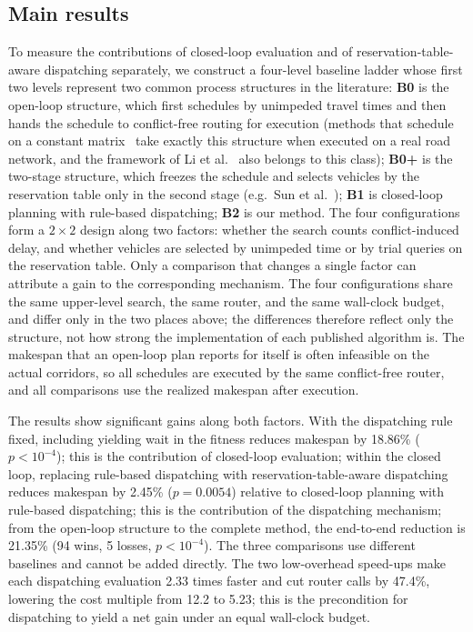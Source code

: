 \documentclass[manuscript,screen,review]{acmart}
\newcommand{\GainLoopRule}{18.86\%}      %
\newcommand{\PLoopRule}{<10^{-4}}
\newcommand{\GainProbeLoop}{2.45\%}      %
\newcommand{\PProbeLoop}{=0.0054}
\newcommand{\GainEndToEnd}{21.35\%}      %
\newcommand{\PEndToEnd}{<10^{-4}}
\newcommand{\WinEndToEnd}{94}
\newcommand{\LoseEndToEnd}{5}
\newcommand{\SpeedupProbe}{2.33}
\newcommand{\RouteCallCut}{47.4\%}
\newcommand{\CostMultBefore}{12.2}
\newcommand{\CostMultAfter}{5.23}
\begin{document}
\subsection{Main results}

To measure the contributions of closed-loop evaluation and of reservation-table-aware dispatching separately, we construct a four-level baseline ladder whose first two levels represent two common process structures in the literature: \textbf{B0} is the open-loop structure, which first schedules by unimpeded travel times and then hands the schedule to conflict-free routing for execution (methods that schedule on a constant matrix~\cite{meng2025cp,qin2026knowledge,jafarian2026integrated} take exactly this structure when executed on a real road network, and the framework of Li et al.~\cite{li2026framework} also belongs to this class); \textbf{B0+} is the two-stage structure, which freezes the schedule and selects vehicles by the reservation table only in the second stage (e.g.\ Sun et al.~\cite{sun2023integrated});
\textbf{B1} is closed-loop planning with rule-based dispatching; \textbf{B2} is our method. The four configurations form a $2\times2$ design along two factors: whether the search counts conflict-induced delay, and whether vehicles are selected by unimpeded time or by trial queries on the reservation table.
Only a comparison that changes a single factor can attribute a gain to the corresponding mechanism.
The four configurations share the same upper-level search, the same router, and the same wall-clock budget, and differ only in the two places above; the differences therefore reflect only the structure, not how strong the implementation of each published algorithm is.
The makespan that an open-loop plan reports for itself is often infeasible on the actual corridors, so all schedules are executed by the same conflict-free router, and all comparisons use the realized makespan after execution.

The results show significant gains along both factors. With the dispatching rule fixed, including yielding wait in the fitness reduces makespan by \GainLoopRule{} ($p\PLoopRule$); this is the contribution of closed-loop evaluation;
within the closed loop, replacing rule-based dispatching with reservation-table-aware dispatching reduces makespan by \GainProbeLoop{} ($p\PProbeLoop$) relative to closed-loop planning with rule-based dispatching; this is the contribution of the dispatching mechanism;
from the open-loop structure to the complete method, the end-to-end reduction is \GainEndToEnd{} (\WinEndToEnd{} wins, \LoseEndToEnd{} losses, $p\PEndToEnd$). The three comparisons use different baselines and cannot be added directly.
The two low-overhead speed-ups make each dispatching evaluation \SpeedupProbe{} times faster and cut router calls by \RouteCallCut{}, lowering the cost multiple from \CostMultBefore{} to \CostMultAfter{}; this is the precondition for dispatching to yield a net gain under an equal wall-clock budget.
\end{document}
